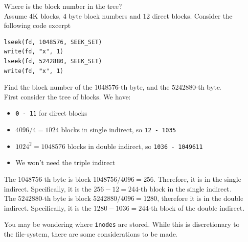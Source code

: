 \documentclass[journal, letterpaper]{IEEEtran}
\begin{document}
\begin{example}{Where is the block number in the tree?} \\
    Assume $4$K blocks, $4$ byte block numbers and 12 direct blocks. Consider the following code excerpt
    \begin{verbatim}
lseek(fd, 1048576, SEEK_SET)
write(fd, "x", 1)
lseek(fd, 5242880, SEEK_SET)
write(fd, "x", 1)\end{verbatim}
    Find the block number of the $1048576$-th byte, and the $5242880$-th byte.
    \newline \\
    First consider the tree of blocks. We have:
    \begin{itemize}
        \item \verb|0 - 11| for direct blocks
        \item $4096 / 4 = 1024$ blocks in single indirect, so \verb|12 - 1035|
        \item $1024^2 = 1048576$ blocks in double indirect, so \verb|1036 - 1049611| 
        \item We won't need the triple indirect
    \end{itemize}
    The $1048756$-th byte is block $1048756 / 4096 = 256$. Therefore, it is in the single indirect. Specifically, it is the $256 - 12 = 244$-th block in the single indirect.
    \newline \\ 
    The $5242880$-th byte is block $5242880 / 4096 = 1280$, therefore it is in the double indirect. Specifically, it is the $1280 - 1036 = 244$-th block of the double indirect.
\end{example}
You may be wondering where \verb|inodes| are stored. While this is discretionary to the file-system, there are some considerations to be made.
\end{document}
